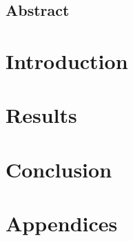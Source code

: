 \documentclass[12pt,a4paper]{book}
\begin{document}
  
  \maketitle
  
  \chapter*{Abstract}
  
  \cleardoublepage
  \tableofcontents

  \part{Introduction}
  
  

  \part{Results}
  
  
  

  \part{Conclusion}
  

  \part*{Appendices}
  \appendix
  
  
  
  
  
  \cleardoublepage
  \nocite{*}
  \printbibliography[heading=bibintoc]

\end{document}
